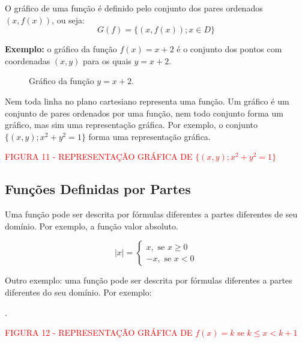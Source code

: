 \documentclass[oneside,a4paper,12pt]{article}
\begin{document}
O gráfico de uma função é definido pelo conjunto dos pares ordenados $(x,f(x))$, ou seja: $$G(f)=\{(x,f(x));x \in D\}$$	
	
\textbf{Exemplo: }o gráfico da função $f(x)=x+2$ é o conjunto dos pontos com coordenadas $(x,y)$ para os quais $y=x+2$.	

\begin{figure}[h]
	\centering
	\caption{Gráfico da função $y = x + 2$.}
\end{figure}


Nem toda linha no plano cartesiano representa uma função. Um gráfico é um conjunto de pares ordenados por uma função, nem todo conjunto forma um gráfico, mas sim uma representação gráfica. Por exemplo, o conjunto $\{(x,y); x^2 + y^2 = 1\}$ forma uma representação gráfica.

\vspace{90pt}

\begin{center}
	\textcolor{red}{FIGURA 11 - REPRESENTAÇÃO GRÁFICA DE $\{(x,y); x^2 + y^2 = 1\}$}
\end{center}


\subsection{Funções Definidas por Partes}

Uma função pode ser descrita por fórmulas diferentes a partes diferentes de seu domínio. Por exemplo, a função valor absoluto.

$$|x| = 
\begin{cases}
x, \text{  se } x \geq 0 \\
-x, \text{ se } x < 0
\end{cases}
$$

Outro exemplo: uma função pode ser descrita por fórmulas diferentes  a partes diferentes do seu domínio. Por exemplo:

\vspace{90pt}
.
\begin{center}
	\textcolor{red}{FIGURA 12 - REPRESENTAÇÃO GRÁFICA DE $f(x) = k$ se $k \leq x < k+1$}
\end{center}
\end{document}
